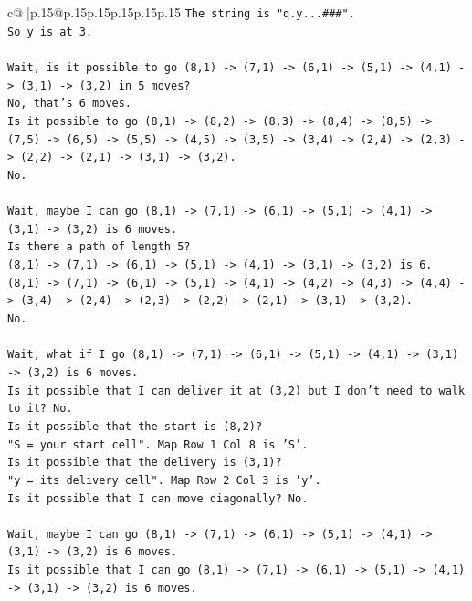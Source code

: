 \documentclass{article}
\begin{document}
{\begin{supertabular}{c@{$\;$}|p{.15\linewidth}@{}p{.15\linewidth}p{.15\linewidth}p{.15\linewidth}p{.15\linewidth}p{.15\linewidth}}
{{{\texttt{The string is "q.y...\#\#\#".} \\
\texttt{So y is at 3.} \\
\\ 
\texttt{Wait, is it possible to go (8,1) {-}> (7,1) {-}> (6,1) {-}> (5,1) {-}> (4,1) {-}> (3,1) {-}> (3,2) in 5 moves?} \\
\texttt{No, that's 6 moves.} \\
\texttt{Is it possible to go (8,1) {-}> (8,2) {-}> (8,3) {-}> (8,4) {-}> (8,5) {-}> (7,5) {-}> (6,5) {-}> (5,5) {-}> (4,5) {-}> (3,5) {-}> (3,4) {-}> (2,4) {-}> (2,3) {-}> (2,2) {-}> (2,1) {-}> (3,1) {-}> (3,2).} \\
\texttt{No.} \\
\\ 
\texttt{Wait, maybe I can go (8,1) {-}> (7,1) {-}> (6,1) {-}> (5,1) {-}> (4,1) {-}> (3,1) {-}> (3,2) is 6 moves.} \\
\texttt{Is there a path of length 5?} \\
\texttt{(8,1) {-}> (7,1) {-}> (6,1) {-}> (5,1) {-}> (4,1) {-}> (3,1) {-}> (3,2) is 6.} \\
\texttt{(8,1) {-}> (7,1) {-}> (6,1) {-}> (5,1) {-}> (4,1) {-}> (4,2) {-}> (4,3) {-}> (4,4) {-}> (3,4) {-}> (2,4) {-}> (2,3) {-}> (2,2) {-}> (2,1) {-}> (3,1) {-}> (3,2).} \\
\texttt{No.} \\
\\ 
\texttt{Wait, what if I go (8,1) {-}> (7,1) {-}> (6,1) {-}> (5,1) {-}> (4,1) {-}> (3,1) {-}> (3,2) is 6 moves.} \\
\texttt{Is it possible that I can deliver it at (3,2) but I don't need to walk to it? No.} \\
\texttt{Is it possible that the start is (8,2)?} \\
\texttt{"S = your start cell". Map Row 1 Col 8 is 'S'.} \\
\texttt{Is it possible that the delivery is (3,1)?} \\
\texttt{"y = its delivery cell". Map Row 2 Col 3 is 'y'.} \\
\texttt{Is it possible that I can move diagonally? No.} \\
\\ 
\texttt{Wait, maybe I can go (8,1) {-}> (7,1) {-}> (6,1) {-}> (5,1) {-}> (4,1) {-}> (3,1) {-}> (3,2) is 6 moves.} \\
\texttt{Is it possible that I can go (8,1) {-}> (7,1) {-}> (6,1) {-}> (5,1) {-}> (4,1) {-}> (3,1) {-}> (3,2) is 6 moves.} \\
}}}
\end{supertabular}}
\end{document}
